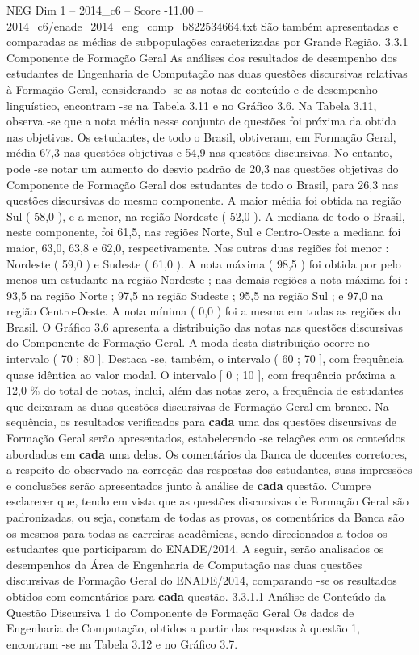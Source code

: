 \begin{textsample}{NEG Dim 1 – 2014\_c6 – Score -11.00 – 2014\_c6/enade\_2014\_eng\_comp\_b822534664.txt}
São também apresentadas e comparadas as médias de subpopulações caracterizadas por Grande Região. 3.3.1 Componente de Formação Geral As análises dos resultados de desempenho dos estudantes de Engenharia de Computação nas duas questões discursivas relativas à Formação Geral, considerando -se as notas de conteúdo e de desempenho linguístico, encontram -se na Tabela 3.11 e no Gráfico 3.6.
Na Tabela 3.11, observa -se que a nota média nesse conjunto de questões foi próxima da obtida nas objetivas.
Os estudantes, de todo o Brasil, obtiveram, em Formação Geral, média 67,3 nas questões objetivas e 54,9 nas questões discursivas.
No entanto, pode -se notar um aumento do desvio padrão de 20,3 nas questões objetivas do Componente de Formação Geral dos estudantes de todo o Brasil, para 26,3 nas questões discursivas do mesmo componente.
A maior média foi obtida na região Sul ( 58,0 ), e a menor, na região Nordeste ( 52,0 ).
A mediana de todo o Brasil, neste componente, foi 61,5, nas regiões Norte, Sul e Centro-Oeste a mediana foi maior, 63,0, 63,8 e 62,0, respectivamente.
Nas outras duas regiões foi menor : Nordeste ( 59,0 ) e Sudeste ( 61,0 ).
A nota máxima ( 98,5 ) foi obtida por pelo menos um estudante na região Nordeste ; nas demais regiões a nota máxima foi : 93,5 na região Norte ; 97,5 na região Sudeste ; 95,5 na região Sul ; e 97,0 na região Centro-Oeste.
A nota mínima ( 0,0 ) foi a mesma em todas as regiões do Brasil.
O Gráfico 3.6 apresenta a distribuição das notas nas questões discursivas do Componente de Formação Geral.
A moda desta distribuição ocorre no intervalo ( 70 ; 80 ].
Destaca -se, também, o intervalo ( 60 ; 70 ], com frequência quase idêntica ao valor modal.
O intervalo [ 0 ; 10 ], com frequência próxima a 12,0 \% do total de notas, inclui, além das notas zero, a frequência de estudantes que deixaram as duas questões discursivas de Formação Geral em branco.
Na sequência, os resultados verificados para \textbf{cada} uma das questões discursivas de Formação Geral serão apresentados, estabelecendo -se relações com os conteúdos abordados em \textbf{cada} uma delas.
Os comentários da Banca de docentes corretores, a respeito do observado na correção das respostas dos estudantes, suas impressões e conclusões serão apresentados junto à análise de \textbf{cada} questão.
Cumpre esclarecer que, tendo em vista que as questões discursivas de Formação Geral são padronizadas, ou seja, constam de todas as provas, os comentários da Banca são os mesmos para todas as carreiras acadêmicas, sendo direcionados a todos os estudantes que participaram do ENADE/2014.
A seguir, serão analisados os desempenhos da Área de Engenharia de Computação nas duas questões discursivas de Formação Geral do ENADE/2014, comparando -se os resultados obtidos com comentários para \textbf{cada} questão. 3.3.1.1 Análise de Conteúdo da Questão Discursiva 1 do Componente de Formação Geral Os dados de Engenharia de Computação, obtidos a partir das respostas à questão 1, encontram -se na Tabela 3.12 e no Gráfico 3.7.

\end{textsample}

